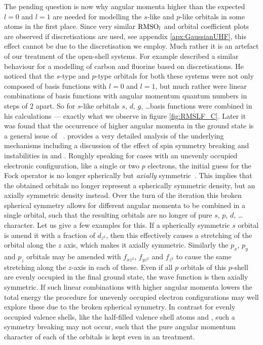 The pending question is now why angular momenta higher than the expected
$l=0$ and $l=1$ are needed for modelling the $s$-like and $p$-like orbitals
in some atoms in the first place.
Since very similar $\text{RMSO}_l$ and \RMS orbital coefficient plots
are observed if \cGTO discretisations are used, see appendix \vref{apx:GaussianUHF},
this effect cannot be due to the \CS discretisation we employ.
Much rather it is an artefact of our \UHF treatment of the open-shell systems.
For example \citet{Cook1981} described a similar behaviour
for a \UHF modelling of carbon and fluorine
based on \cGTO discretisations.
He noticed that the $s$-type and $p$-type \SCF orbitals
for both these systems were not only
composed of \cGTO basis functions with $l=0$ and $l=1$,
but much rather were linear combinations of basis functions with
angular momentum quantum numbers in steps of $2$ apart.
So for $s$-like \SCF orbitals $s$, $d$, $g$, \ldots basis functions
were combined in his calculations --- exactly what we observe in figure \ref{fig:RMSLF_C}.
Later it was found that the occurrence of higher angular momenta in
the ground state is a general issue of
\UHF~\cite{Fukutome1981,Cook1984,McWeeny1985}.
\citet{Fukutome1981} provides a very detailed analysis of the
underlying mechanisms including a discussion of the effect of
spin symmetry breaking and \HF instabilities in \UHF and \GUHF.
Roughly speaking for cases with an unevenly occupied electronic configuration,
like a single or two $p$ electrons,
the initial guess for the \UHF Fock operator is
no longer spherically but \emph{axially} symmetric~\cite{McWeeny1985}.
This implies that the obtained \SCF orbitals no longer represent
a spherically symmetric density, but an axially symmetric density instead.
Over the turn of the \UHF iteration
this broken spherical symmetry allows for different
angular momenta to be combined in a single orbital,
such that the resulting \SCF orbitals are no longer of pure
$s$, $p$, $d$, \ldots character.
Let us give a few examples for this.
If a spherically symmetric $s$ orbital is amend it with
a fraction of $d_{z^2}$, then this effectively causes a stretching
of the orbital along the $z$ axis,
which makes it axially symmetric.
Similarly the $p_x$, $p_y$ and $p_z$ orbitals
may be amended with $f_{xz^2}$, $f_{yz^2}$ and $f_{z^3}$
to cause the same stretching along the $z$-axis in each of these.
Even if all $p$ orbitals of this $p$-shell are evenly occupied in the final \HF
ground state, the wave function is then axially symmetric.
If such linear combinations with higher angular momenta
lowers the total \SCF energy
the \UHF procedure for unevenly occupied electron configurations
may well explore these due to the broken spherical symmetry.
In contrast for evenly occupied valence shells,
like the half-filled valence shell atoms  and ,
such a symmetry breaking may not occur,
such that the pure angular momentum character of each of the orbitals is kept
even in an \UHF treatment.


